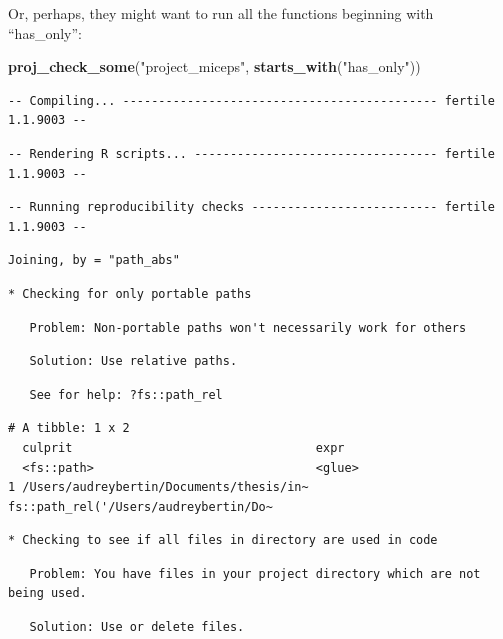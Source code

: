 \documentclass[12pt,twoside]{reedthesis}
\newenvironment{Shaded}{\begin{snugshade}}{\end{snugshade}}
\newcommand{\KeywordTok}[1]{\textcolor[rgb]{0.13,0.29,0.53}{\textbf{#1}}}
\newcommand{\NormalTok}[1]{#1}
\newcommand{\StringTok}[1]{\textcolor[rgb]{0.31,0.60,0.02}{#1}}
\begin{document}
Or, perhaps, they might want to run all the functions beginning with ``has\_only'':
\begin{Shaded}
\begin{Highlighting}[]
\KeywordTok{proj_check_some}\NormalTok{(}\StringTok{"project_miceps"}\NormalTok{, }\KeywordTok{starts_with}\NormalTok{(}\StringTok{"has_only"}\NormalTok{))}
\end{Highlighting}
\end{Shaded}
\footnotesize
\begin{verbatim}
-- Compiling... -------------------------------------------- fertile 1.1.9003 --
\end{verbatim}
\begin{verbatim}
-- Rendering R scripts... ---------------------------------- fertile 1.1.9003 --
\end{verbatim}
\begin{verbatim}
-- Running reproducibility checks -------------------------- fertile 1.1.9003 --
\end{verbatim}
\begin{verbatim}
Joining, by = "path_abs"
\end{verbatim}
\begin{verbatim}
* Checking for only portable paths
\end{verbatim}
\begin{verbatim}
   Problem: Non-portable paths won't necessarily work for others
\end{verbatim}
\begin{verbatim}
   Solution: Use relative paths.
\end{verbatim}
\begin{verbatim}
   See for help: ?fs::path_rel
\end{verbatim}
\begin{verbatim}
# A tibble: 1 x 2
  culprit                                  expr                                 
  <fs::path>                               <glue>                               
1 /Users/audreybertin/Documents/thesis/in~ fs::path_rel('/Users/audreybertin/Do~
\end{verbatim}
\begin{verbatim}
* Checking to see if all files in directory are used in code
\end{verbatim}
\begin{verbatim}
   Problem: You have files in your project directory which are not being used.
\end{verbatim}
\begin{verbatim}
   Solution: Use or delete files.
\end{verbatim}
\end{document}
